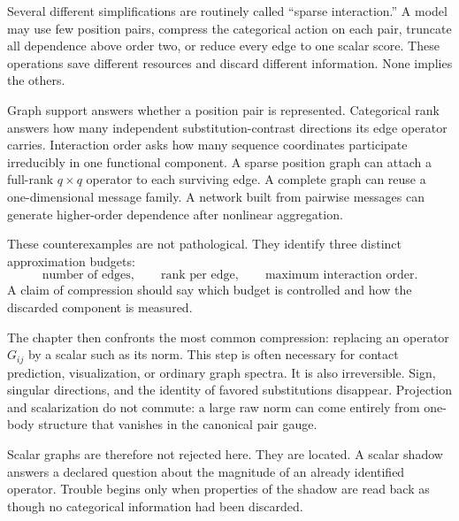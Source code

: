 Several different simplifications are routinely called ``sparse interaction.''  A model may use
few position pairs, compress the categorical action on each pair, truncate all dependence above
order two, or reduce every edge to one scalar score.  These operations save different resources
and discard different information.  None implies the others.

Graph support answers whether a position pair is represented.  Categorical rank answers how many
independent substitution-contrast directions its edge operator carries.  Interaction order asks
how many sequence coordinates participate irreducibly in one functional component.  A sparse
position graph can attach a full-rank $q\times q$ operator to each surviving edge.  A complete graph
can reuse a one-dimensional message family.  A network built from pairwise messages can generate
higher-order dependence after nonlinear aggregation.

These counterexamples are not pathological.  They identify three distinct approximation budgets:
\begin{equation}
\text{number of edges},\qquad
\text{rank per edge},\qquad
\text{maximum interaction order}.
\label{eq:book-three-complexities}
\end{equation}
A claim of compression should say which budget is controlled and how the discarded component is
measured.

The chapter then confronts the most common compression: replacing an operator $G_{ij}$ by a scalar
such as its norm.  This step is often necessary for contact prediction, visualization, or ordinary
graph spectra.  It is also irreversible.  Sign, singular directions, and the identity of favored
substitutions disappear.  Projection and scalarization do not commute: a large raw norm can come
entirely from one-body structure that vanishes in the canonical pair gauge.

Scalar graphs are therefore not rejected here.  They are located.  A scalar shadow answers a
declared question about the magnitude of an already identified operator.  Trouble begins only when
properties of the shadow are read back as though no categorical information had been discarded.
